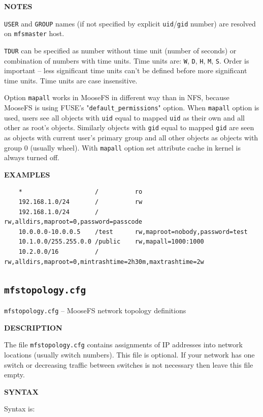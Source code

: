 \documentclass[a4paper,11pt,english]{report}
\def\code#1{\texttt{#1}}
\begin{document}
				\textbf{NOTES}
				
				\code{USER}  and \code{GROUP} names (if not specified by explicit \code{uid}/\code{gid} number) are
				resolved on \code{mfsmaster} host.

				\code{TDUR} can be specified as number without time unit (number  of  seconds)
				or  combination  of numbers with time units. Time units are: \code{W}, \code{D}, \code{H}, \code{M}, \code{S}. Order is important -- less  significant  time  units  can't  be  defined before more significant time units.  Time units are case insensitive.

				Option  \code{mapall} works  in MooseFS in different way than in NFS, because MooseFS is  using  FUSE's  "\code{default\_permissions}"  option.  When  \code{mapall} option  is  used, users see all objects with \code{uid} equal to mapped \code{uid} as their own and all other as root's objects. Similarly objects  with  \code{gid} equal  to  mapped  \code{gid}  are seen as objects with current user's primary group and all other objects as objects with group  0  (usually  wheel). With \code{mapall} option set attribute cache in kernel is always turned off.
				\bigskip

				\textbf{EXAMPLES}
				
				\begin{lstlisting}
	*					 /			ro
	192.168.1.0/24		 /			rw
	192.168.1.0/24		 /			rw,alldirs,maproot=0,password=passcode
	10.0.0.0-10.0.0.5	 /test		rw,maproot=nobody,password=test
	10.1.0.0/255.255.0.0 /public	rw,mapall=1000:1000
	10.2.0.0/16			 /			rw,alldirs,maproot=0,mintrashtime=2h30m,maxtrashtime=2w
				\end{lstlisting}
			
			\subsection{\code{mfstopology.cfg}}
				\code{mfstopology.cfg} -- MooseFS network topology definitions
				\bigskip
				
				\textbf{DESCRIPTION}
				
				The file \code{mfstopology.cfg} contains assignments of IP addresses into
					network locations (usually switch numbers). This file is optional. If your
					network  has  one  switch or decreasing traffic between switches is not
					necessary then leave this file empty.
				\bigskip
				
				\textbf{SYNTAX}
				
					Syntax is:
					
\end{document}
